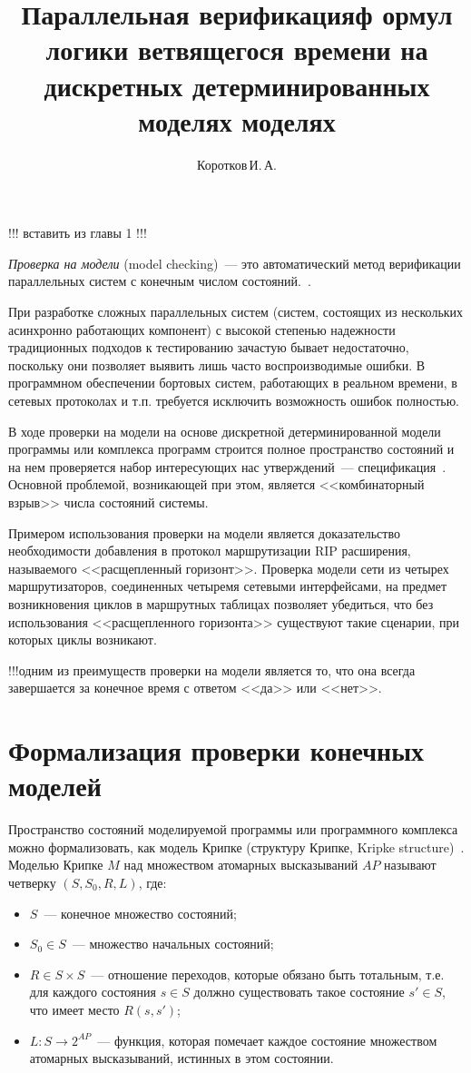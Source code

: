 \documentclass[a4paper,notitlepage,14pt]{article}
\title{Параллельная верификацияф ормул логики ветвящегося времени на дискретных
  детерминированных моделях моделях} \author{Коротков\,И.\,А.}
\begin{document}
\maketitle

!!! вставить из главы 1 !!!

\emph{Проверка на модели} (model checking)~--- это автоматический метод верификации
параллельных систем с конечным числом состояний.~\cite{Clarke}.

При разработке сложных параллельных систем (систем, состоящих из нескольких асинхронно
работающих компонент) с высокой степенью надежности традиционных подходов к тестированию
зачастую бывает недостаточно, поскольку они позволяет выявить лишь часто воспроизводимые
ошибки. В программном обеспечении бортовых систем, работающих в реальном времени, в
сетевых протоколах и т.п. требуется исключить возможность ошибок полностью.

В ходе проверки на модели на основе дискретной детерминированной модели программы или
комплекса программ строится полное пространство состояний и на нем проверяется набор
интересующих нас утверждений~--- спецификация~\cite{Clarke}. Основной проблемой,
возникающей при этом, является <<комбинаторный взрыв>> числа состояний системы.

Примером использования проверки на модели является доказательство необходимости добавления
в протокол маршрутизации RIP расширения, называемого <<расщепленный горизонт>>. Проверка
модели сети из четырех маршрутизаторов, соединенных четыремя сетевыми интерфейсами, на
предмет возникновения циклов в маршрутных таблицах позволяет убедиться, что без
использования <<расщепленного горизонта>> существуют такие сценарии, при которых циклы
возникают.~\cite{RipOnSpin}

!!!одним из преимуществ проверки на модели является то, что она всегда завершается за
конечное время с ответом <<да>> или <<нет>>.

\section{Формализация проверки конечных моделей}
\label{sec:modelchecking}

Пространство состояний моделируемой программы или программного комплекса можно
формализовать, как модель Крипке (структуру Крипке, Kripke
structure)~\cite{Clarke}. Моделью Крипке $M$ над множеством атомарных высказываний $AP$
называют четверку $(S, S_0, R, L)$, где:

\begin{itemize}
\item $S$~--- конечное множество состояний;
\item $S_0 \in S$~--- множество начальных состояний;
\item $R \in S \times S$~--- отношение переходов, которые обязано быть тотальным, т.е. для
  каждого состояния $s \in S$ должно существовать такое состояние $s' \in S$, что имеет
  место $R(s, s')$;
\item $L\colon S \rightarrow 2^{AP}$~--- функция, которая помечает каждое состояние
  множеством атомарных высказываний, истинных в этом состоянии.
\end{itemize}
\end{document}
